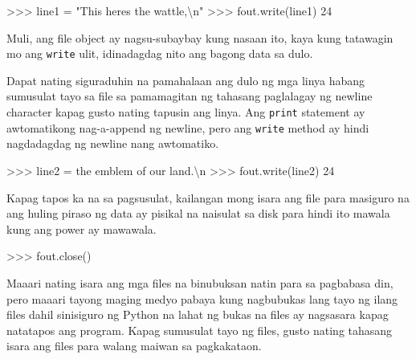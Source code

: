 \documentclass[10pt,]{book}
\newenvironment{Shaded}{}{}
\newcommand{\CharTok}[1]{\textcolor[rgb]{0.25,0.44,0.63}{#1}}
\newcommand{\DecValTok}[1]{\textcolor[rgb]{0.25,0.63,0.44}{#1}}
\newcommand{\NormalTok}[1]{#1}
\newcommand{\OperatorTok}[1]{\textcolor[rgb]{0.40,0.40,0.40}{#1}}
\newcommand{\StringTok}[1]{\textcolor[rgb]{0.25,0.44,0.63}{#1}}
\begin{document}
\begin{Shaded}
\begin{Highlighting}[]
\OperatorTok{\textgreater{}\textgreater{}\textgreater{}}\NormalTok{ line1 }\OperatorTok{=} \StringTok{"This here\textquotesingle{}s the wattle,}\CharTok{\textbackslash{}n}\StringTok{"}
\OperatorTok{\textgreater{}\textgreater{}\textgreater{}}\NormalTok{ fout.write(line1)}
\DecValTok{24}
\end{Highlighting}
\end{Shaded}


Muli, ang file object ay nagsu-subaybay kung nasaan ito, kaya kung
tatawagin mo ang \texttt{write} ulit, idinadagdag nito ang bagong data
sa dulo.

Dapat nating siguraduhin na pamahalaan ang dulo ng mga linya habang
sumusulat tayo sa file sa pamamagitan ng tahasang paglalagay ng newline
character kapag gusto nating tapusin ang linya. Ang \texttt{print}
statement ay awtomatikong nag-a-append ng newline, pero ang
\texttt{write} method ay hindi nagdadagdag ng newline nang awtomatiko.

\begin{Shaded}
\begin{Highlighting}[]
\OperatorTok{\textgreater{}\textgreater{}\textgreater{}}\NormalTok{ line2 }\OperatorTok{=} \StringTok{\textquotesingle{}the emblem of our land.}\CharTok{\textbackslash{}n}\StringTok{\textquotesingle{}}
\OperatorTok{\textgreater{}\textgreater{}\textgreater{}}\NormalTok{ fout.write(line2)}
\DecValTok{24}
\end{Highlighting}
\end{Shaded}

Kapag tapos ka na sa pagsusulat, kailangan mong isara ang file para
masiguro na ang huling piraso ng data ay pisikal na naisulat sa disk
para hindi ito mawala kung ang power ay mawawala.

\begin{Shaded}
\begin{Highlighting}[]
\OperatorTok{\textgreater{}\textgreater{}\textgreater{}}\NormalTok{ fout.close()}
\end{Highlighting}
\end{Shaded}

Maaari nating isara ang mga files na binubuksan natin para sa pagbabasa
din, pero maaari tayong maging medyo pabaya kung nagbubukas lang tayo ng
ilang files dahil sinisiguro ng Python na lahat ng bukas na files ay
nagsasara kapag natatapos ang program. Kapag sumusulat tayo ng files,
gusto nating tahasang isara ang files para walang maiwan sa pagkakataon.
\end{document}
